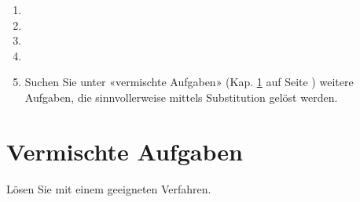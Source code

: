 \begin{enumerate}[label=\alph*)]
\item
{}



\item
{}



\item %




\item
{}


\item
Suchen Sie unter «vermischte Aufgaben» (Kap. \ref{vermischteAufgaben}
auf Seite \pageref{vermischteAufgaben})
weitere Aufgaben, die sinnvollerweise mittels Substitution gelöst
werden.

\end{enumerate}
\newpage
\section{Vermischte Aufgaben}\label{vermischteAufgaben}
Lösen Sie mit einem geeigneten Verfahren.

